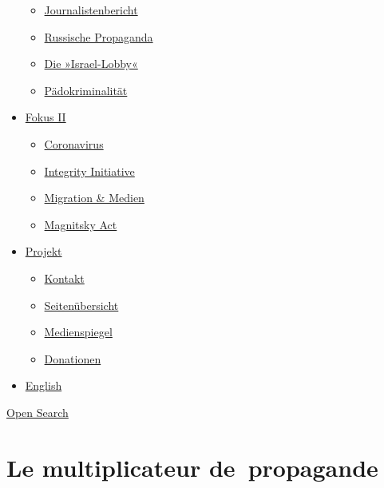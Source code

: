 \begin{itemize}
  \begin{itemize}
  \tightlist
  \item
    \href{https://swprs.org/bericht-eines-journalisten/}{Journalistenbericht}
  \item
    \href{https://swprs.org/russische-propaganda/}{Russische Propaganda}
  \item
    \href{https://swprs.org/die-israel-lobby-fakten-und-mythen/}{Die
    »Israel-Lobby«}
  \item
    \href{https://swprs.org/geopolitik-und-paedokriminalitaet/}{Pädokriminalität}
  \end{itemize}
\item
  \href{https://swprs.org/migration-und-medien/}{Fokus II}

  \begin{itemize}
  \tightlist
  \item
    \href{https://swprs.org/covid-19-hinweis-ii/}{Coronavirus}
  \item
    \href{https://swprs.org/die-integrity-initiative/}{Integrity
    Initiative}
  \item
    \href{https://swprs.org/migration-und-medien/}{Migration \& Medien}
  \item
    \href{https://swprs.org/der-fall-magnitsky/}{Magnitsky Act}
  \end{itemize}
\item
  \href{https://swprs.org/kontakt/}{Projekt}

  \begin{itemize}
  \tightlist
  \item
    \href{https://swprs.org/kontakt/}{Kontakt}
  \item
    \href{https://swprs.org/uebersicht/}{Seitenübersicht}
  \item
    \href{https://swprs.org/medienspiegel/}{Medienspiegel}
  \item
    \href{https://swprs.org/donationen/}{Donationen}
  \end{itemize}
\item
  \href{https://swprs.org/contact/}{English}
\end{itemize}

\protect\hyperlink{}{Open Search}

\hypertarget{le-multiplicateur-de-propagande}{%
\section{Le multiplicateur
de~propagande}\label{le-multiplicateur-de-propagande}}

